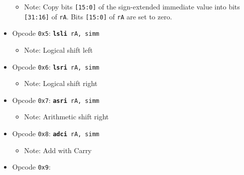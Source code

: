 \documentclass{article}
\begin{document}
\begin{itemize}
\begin{itemize}
			\item Note:  Copy bits \texttt{[15:0]} of the sign-extended
			immediate value into bits \texttt{[31:16]} of \texttt{rA}.
			Bits \texttt{[15:0]} of \texttt{rA} are set to zero.
		\end{itemize}
		\item Opcode \texttt{0x5}:
			\texttt{\textbf{lsli} rA, simm}
		\begin{itemize}
			\item Note:  Logical shift left
		\end{itemize}
		\item Opcode \texttt{0x6}:
			\texttt{\textbf{lsri} rA, simm}
		\begin{itemize}
			\item Note:  Logical shift right
		\end{itemize}
		\item Opcode \texttt{0x7}:
			\texttt{\textbf{asri} rA, simm}
		\begin{itemize}
			\item Note:  Arithmetic shift right
		\end{itemize}
		\item Opcode \texttt{0x8}:
			\texttt{\textbf{adci} rA, simm}
		\begin{itemize}
			\item Note:  Add with Carry
		\end{itemize}
		\item Opcode \texttt{0x9}:

\end{itemize}
\end{document}
